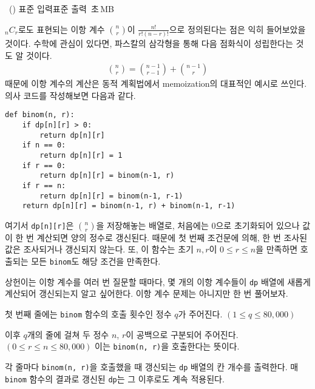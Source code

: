 \begin{problem}{\kcpcpprobbinom\ (\kcpcpprobbinomshort)}
    {표준 입력}{표준 출력}
    {\kcpcpprobbinomtime\,초}{\kcpcpprobbinommemory\,MB}{}
    
    $_{n}C_{r}$로도 표현되는 이항 계수 $\binom{n}{r}$이 $\frac{n!}{r!(n-r)!}$으로 정의된다는 점은 익히 들어보았을 것이다. 수학에 관심이 있다면, 파스칼의 삼각형을 통해 다음 점화식이 성립한다는 것도 알 것이다.
    \begin{align*}
        \binom{n}{r} = \binom{n-1}{r-1} + \binom{n-1}{r}
    \end{align*}
    때문에 이항 계수의 계산은 동적 계획법에서 memoization의 대표적인 예시로 쓰인다. 의사 코드를 작성해보면 다음과 같다.
    \begin{verbatim}
def binom(n, r):
    if dp[n][r] > 0:
        return dp[n][r]
    if n == 0:
        return dp[n][r] = 1
    if r == 0:
        return dp[n][r] = binom(n-1, r)
    if r == n:
        return dp[n][r] = binom(n-1, r-1)
    return dp[n][r] = binom(n-1, r) + binom(n-1, r-1)
\end{verbatim}
    여기서 \verb|dp[n][r]|은 $\binom{n}{r}$을 저장해놓는 배열로, 처음에는 0으로 초기화되어 있으나 값이 한 번 계산되면 양의 정수로 갱신된다. 때문에 첫 번째 조건문에 의해, 한 번 조사된 값은 조사되거나 갱신되지 않는다. 또, 이 함수는 초기 $n, r$이 $ 0 \leq r \leq n$을 만족하면 호출되는 모든 \verb|binom|도 해당 조건을 만족한다.
    
    상헌이는 이항 계수를 여러 번 질문할 때마다, 몇 개의 이항 계수들이 \verb|dp| 배열에 새롭게 계산되어 갱신되는지 알고 싶어한다. 이항 계수 문제는 아니지만 한 번 풀어보자.
    
    \InputFile
    첫 번째 줄에는 \verb|binom| 함수의 호출 횟수인 정수 $q$가 주어진다. $ (1 \leq q \leq 80,000) $
    
    이후 $q$개의 줄에 걸쳐 두 정수 $n$, $r$이 공백으로 구분되어 주어진다. $ (0 \leq r \leq n \leq 80,000) $ 이는 \verb|binom(n, r)|을 호출한다는 뜻이다.
    
    \OutputFile
    
    각 줄마다 \verb|binom(n, r)|을 호출했을 때 갱신되는 \verb|dp| 배열의 칸 개수를 출력한다. 매 \verb|binom| 함수의 결과로 갱신된 \verb|dp|는 그 이후로도 계속 적용된다.
    
    \Examples
    \begin{example}
    \end{example}


\end{problem}
